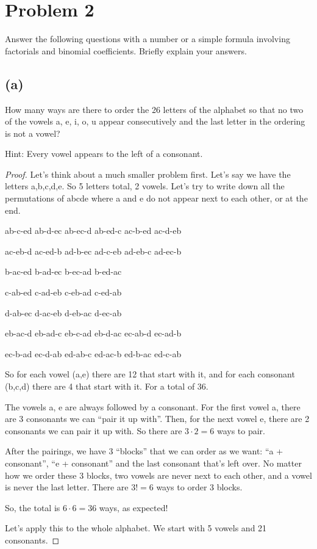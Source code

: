 \documentclass[14pt]{extarticle}
\begin{document}
\section{Problem 2}
Answer the following questions with a number or a simple formula involving factorials and binomial coefficients. Briefly explain your answers.
\subsection{(a)}
How many ways are there to order the 26 letters of the alphabet so that no two of the vowels a, e, i, o, u appear consecutively and the last letter in the ordering is not a vowel?

Hint: Every vowel appears to the left of a consonant.
\begin{proof}
Let's think about a much smaller problem first. Let's say we have the letters a,b,c,d,e. So 5 letters total, 2 vowels. Let's try to write down all the permutations of abcde where a and e do not appear next to each other, or at the end.

ab-c-ed ab-d-ec ab-ec-d ab-ed-c ac-b-ed ac-d-eb 

ac-eb-d ac-ed-b ad-b-ec ad-c-eb ad-eb-c ad-ec-b

b-ac-ed b-ad-ec b-ec-ad b-ed-ac

c-ab-ed c-ad-eb c-eb-ad c-ed-ab

d-ab-ec d-ac-eb d-eb-ac d-ec-ab

eb-ac-d eb-ad-c eb-c-ad eb-d-ac ec-ab-d ec-ad-b 

ec-b-ad ec-d-ab ed-ab-c ed-ac-b ed-b-ac ed-c-ab 

So for each vowel (a,e) there are 12 that start with it, and for each consonant (b,c,d) there are 4 that start with it. For a total of 36.

The vowels a, e are always followed by a consonant. For the first vowel a, there are 3 consonants we can ``pair it up with''. Then, for the next vowel e, there are 2 consonants we can pair it up with. So there are $3 \cdot 2 = 6$ ways to pair.

After the pairings, we have 3 ``blocks'' that we can order as we want: ``a + consonant'', ``e + consonant'' and the last consonant that's left over. No matter how we order these 3 blocks, two vowels are never next to each other, and a vowel is never the last letter. There are $3! = 6$ ways to order 3 blocks.

So, the total is $6 \cdot 6 = 36$ ways, as expected!

Let's apply this to the whole alphabet. We start with 5 vowels and 21 consonants.


\end{proof}
\end{document}
